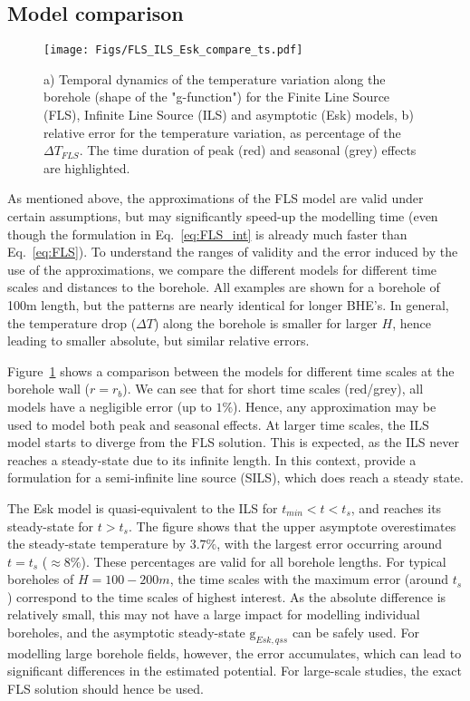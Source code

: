 \subsection*{Model comparison}
\label{comparison}

\begin{figure}[t]
    \centering
    \texttt{[image: Figs/FLS\_ILS\_Esk\_compare\_ts.pdf]}
    \caption{a) Temporal dynamics of the temperature variation along the borehole (shape of the "g-function") for the Finite Line Source (FLS), Infinite Line Source (ILS) and asymptotic (Esk) models, b) relative error for the temperature variation, as percentage of the $\Delta T_{FLS}$. The time duration of peak (red) and seasonal (grey) effects are highlighted.}
    \label{fig:T_dynamics}
\end{figure}

As mentioned above, the approximations of the FLS model are valid under certain assumptions, but may significantly speed-up the modelling time (even though the formulation in Eq.~\ref{eq:FLS_int} is already much faster than Eq.~\ref{eq:FLS}). To understand the ranges of validity and the error induced by the use of the approximations, we compare the different models for different time scales and distances to the borehole. All examples are shown for a borehole of 100m length, but the patterns are nearly identical for longer BHE's. In general, the temperature drop ($\Delta T$) along the borehole is smaller for larger $H$, hence leading to smaller absolute, but similar relative errors. 

Figure~\ref{fig:T_dynamics} shows a comparison between the models for different time scales at the borehole wall ($r = r_b$). We can see that for short time scales (red/grey), all models have a negligible error (up to $1\%$). 
Hence, any approximation may be used to model both peak and seasonal effects. At larger time scales, the ILS model starts to diverge from the FLS solution. 
This is expected, as the ILS never reaches a steady-state due to its infinite length. In this context, \citet{bandos_finite_2009} provide a formulation for a semi-infinite line source (SILS), which does reach a steady state. 

The Esk model is quasi-equivalent to the ILS for $t_{min} < t < t_s$, and reaches its steady-state for $t > t_s$. The figure shows that the upper asymptote overestimates the steady-state temperature by $3.7\%$, with the largest error occurring around $t = t_s$ ($\approx 8\%$). These percentages are valid for all borehole lengths. 
For typical boreholes of $H=100-200m$, the time scales with the maximum error (around $t_s$) correspond to the time scales of highest interest. 
As the absolute difference is relatively small, this may not have a large impact for modelling individual boreholes, and the asymptotic steady-state $\mathrm{g}_{Esk, qss}$ can be safely used. For modelling large borehole fields, however, the error accumulates, which can lead to significant differences in the estimated potential. For large-scale studies, the exact FLS solution should hence be used.

